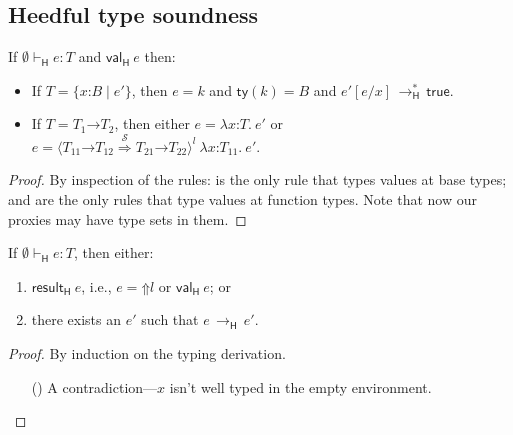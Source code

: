 \documentclass[9pt]{extarticle}
\newcommand{\ottnt}[1]{\mathit{#1}}
\newcommand{\ottsym}[1]{#1}
\begin{document}
{\subsection{Heedful type soundness}
\label{app:heedfulsoundness}

\begin{lemma}
  \label{lem:heedfulcanonicalforms}
  If $ \emptyset   \vdash _{  \mathsf{H}  }  \ottnt{e}  :  \ottnt{T} $ and $ \mathsf{val} _{  \mathsf{H}  }~ \ottnt{e} $ then:
\begin{itemize}
  \item If $\ottnt{T}  \ottsym{=}   \{ \mathit{x} \mathord{:} \ottnt{B} \mathrel{\mid} \ottnt{e'} \} $, then $\ottnt{e}  \ottsym{=}  \ottnt{k}$ and $ \mathsf{ty} ( \ottnt{k} )   \ottsym{=}  \ottnt{B}$
    and $ \ottnt{e'}  [  \ottnt{e} / \mathit{x}  ]  \,  \longrightarrow ^{*}_{  \mathsf{H}  }  \,  \mathsf{true} $.
  \item If $\ottnt{T}  \ottsym{=}   \ottnt{T_{{\mathrm{1}}}} \mathord{ \rightarrow } \ottnt{T_{{\mathrm{2}}}} $, then either $\ottnt{e}  \ottsym{=}   \lambda \mathit{x} \mathord{:} \ottnt{T} .~  \ottnt{e'} $ or $\ottnt{e}  \ottsym{=}   \langle   \ottnt{T_{{\mathrm{11}}}} \mathord{ \rightarrow } \ottnt{T_{{\mathrm{12}}}}   \mathord{ \overset{ \mathcal{S} }{\Rightarrow} }   \ottnt{T_{{\mathrm{21}}}} \mathord{ \rightarrow } \ottnt{T_{{\mathrm{22}}}}   \rangle^{ \ottnt{l} } ~   \lambda \mathit{x} \mathord{:} \ottnt{T_{{\mathrm{11}}}} .~  \ottnt{e'}  $.
  \end{itemize}
{\iffull
  \begin{proof}
    By inspection of the rules:  is the only rule that types
    values at base types;  and  are the only rules
    that type values at function types. Note that now our proxies may
    have type sets in them.
  \end{proof}
  \fi}
\end{lemma}

\begin{lemma}
  If $ \emptyset   \vdash _{  \mathsf{H}  }  \ottnt{e}  :  \ottnt{T} $, then either:
  \begin{enumerate}
  \item $ \mathsf{result} _{  \mathsf{H}  }~ \ottnt{e} $, i.e., $\ottnt{e}  \ottsym{=}   \mathord{\Uparrow}  \ottnt{l} $ or $ \mathsf{val} _{  \mathsf{H}  }~ \ottnt{e} $;
    or
  \item there exists an $\ottnt{e'}$ such that $\ottnt{e} \,  \longrightarrow _{  \mathsf{H}  }  \, \ottnt{e'}$.
  \end{enumerate}
\begin{proof}
    By induction on the typing derivation.
{\iffull
    \begin{itemize}
    \item[(\T{Var})] A contradiction---$\mathit{x}$ isn't well typed in the
      empty environment.


\end{itemize}}
\end{proof}
\end{lemma}}
\end{document}
